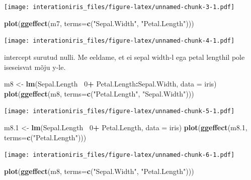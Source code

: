 \documentclass[]{book}
\newenvironment{Shaded}{\begin{snugshade}}{\end{snugshade}}
\newcommand{\KeywordTok}[1]{\textcolor[rgb]{0.13,0.29,0.53}{\textbf{#1}}}
\newcommand{\DataTypeTok}[1]{\textcolor[rgb]{0.13,0.29,0.53}{#1}}
\newcommand{\DecValTok}[1]{\textcolor[rgb]{0.00,0.00,0.81}{#1}}
\newcommand{\StringTok}[1]{\textcolor[rgb]{0.31,0.60,0.02}{#1}}
\newcommand{\OperatorTok}[1]{\textcolor[rgb]{0.81,0.36,0.00}{\textbf{#1}}}
\newcommand{\NormalTok}[1]{#1}
\begin{document}
\texttt{[image: interationiris\_files/figure-latex/unnamed-chunk-3-1.pdf]}

\begin{Shaded}
\begin{Highlighting}[]
\KeywordTok{plot}\NormalTok{(}\KeywordTok{ggeffect}\NormalTok{(m7, }\DataTypeTok{terms=}\KeywordTok{c}\NormalTok{(}\StringTok{"Sepal.Width"}\NormalTok{, }\StringTok{"Petal.Length"}\NormalTok{)))}
\end{Highlighting}
\end{Shaded}

\texttt{[image: interationiris\_files/figure-latex/unnamed-chunk-4-1.pdf]}

intercept surutud nulli. Me eeldame, et ei sepal width-l ega petal
lengthil pole iseseisvat mõju y-le.

\begin{Shaded}
\begin{Highlighting}[]
\NormalTok{m8 <-}\StringTok{ }\KeywordTok{lm}\NormalTok{(Sepal.Length}\OperatorTok{~}\StringTok{ }\DecValTok{0}\OperatorTok{+}\StringTok{ }\NormalTok{Petal.Length}\OperatorTok{:}\NormalTok{Sepal.Width, }\DataTypeTok{data =}\NormalTok{ iris)}
\KeywordTok{plot}\NormalTok{(}\KeywordTok{ggeffect}\NormalTok{(m8, }\DataTypeTok{terms=}\KeywordTok{c}\NormalTok{(}\StringTok{"Petal.Length"}\NormalTok{, }\StringTok{"Sepal.Width"}\NormalTok{)))}
\end{Highlighting}
\end{Shaded}

\texttt{[image: interationiris\_files/figure-latex/unnamed-chunk-5-1.pdf]}

\begin{Shaded}
\begin{Highlighting}[]
\NormalTok{m8.}\DecValTok{1}\NormalTok{ <-}\StringTok{ }\KeywordTok{lm}\NormalTok{(Sepal.Length}\OperatorTok{~}\StringTok{ }\DecValTok{0}\OperatorTok{+}\StringTok{ }\NormalTok{Petal.Length, }\DataTypeTok{data =}\NormalTok{ iris)}
\KeywordTok{plot}\NormalTok{(}\KeywordTok{ggeffect}\NormalTok{(m8.}\DecValTok{1}\NormalTok{, }\DataTypeTok{terms=}\KeywordTok{c}\NormalTok{(}\StringTok{"Petal.Length"}\NormalTok{)))}
\end{Highlighting}
\end{Shaded}

\texttt{[image: interationiris\_files/figure-latex/unnamed-chunk-6-1.pdf]}

\begin{Shaded}
\begin{Highlighting}[]
\KeywordTok{plot}\NormalTok{(}\KeywordTok{ggeffect}\NormalTok{(m8, }\DataTypeTok{terms=}\KeywordTok{c}\NormalTok{(}\StringTok{"Sepal.Width"}\NormalTok{, }\StringTok{"Petal.Length"}\NormalTok{)))}
\end{Highlighting}
\end{Shaded}
\end{document}
